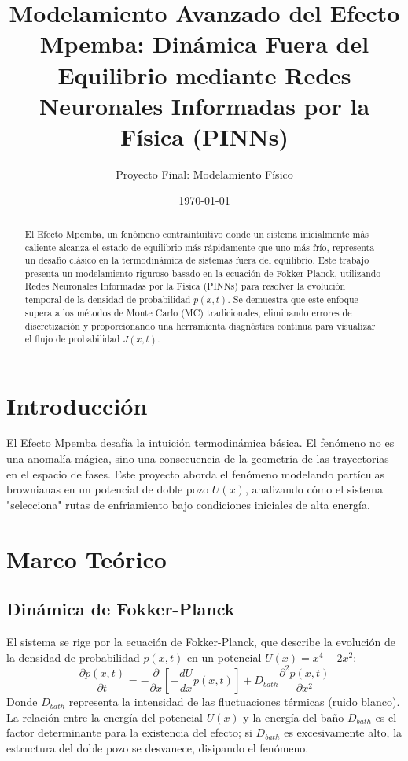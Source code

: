 \documentclass[a4paper,12pt]{article}
\title{Modelamiento Avanzado del Efecto Mpemba: Dinámica Fuera del Equilibrio mediante Redes Neuronales Informadas por la Física (PINNs)}
\author{Proyecto Final: Modelamiento Físico}
\date{\today}
\begin{document}
\maketitle

\begin{abstract}
El Efecto Mpemba, un fenómeno contraintuitivo donde un sistema inicialmente más caliente alcanza el estado de equilibrio más rápidamente que uno más frío, representa un desafío clásico en la termodinámica de sistemas fuera del equilibrio. Este trabajo presenta un modelamiento riguroso basado en la ecuación de Fokker-Planck, utilizando Redes Neuronales Informadas por la Física (PINNs) para resolver la evolución temporal de la densidad de probabilidad $p(x,t)$. Se demuestra que este enfoque supera a los métodos de Monte Carlo (MC) tradicionales, eliminando errores de discretización y proporcionando una herramienta diagnóstica continua para visualizar el flujo de probabilidad $J(x,t)$.
\end{abstract}

\section{Introducción}
El Efecto Mpemba desafía la intuición termodinámica básica. El fenómeno no es una anomalía mágica, sino una consecuencia de la geometría de las trayectorias en el espacio de fases. Este proyecto aborda el fenómeno modelando partículas brownianas en un potencial de doble pozo $U(x)$, analizando cómo el sistema "selecciona" rutas de enfriamiento bajo condiciones iniciales de alta energía.

\section{Marco Teórico}
\subsection{Dinámica de Fokker-Planck}
El sistema se rige por la ecuación de Fokker-Planck, que describe la evolución de la densidad de probabilidad $p(x,t)$ en un potencial $U(x) = x^4 - 2x^2$:
\begin{equation}
\frac{\partial p(x,t)}{\partial t} = -\frac{\partial}{\partial x} \left[ -\frac{dU}{dx} p(x,t) \right] + D_{bath} \frac{\partial^2 p(x,t)}{\partial x^2}
\end{equation}
Donde $D_{bath}$ representa la intensidad de las fluctuaciones térmicas (ruido blanco). La relación entre la energía del potencial $U(x)$ y la energía del baño $D_{bath}$ es el factor determinante para la existencia del efecto; si $D_{bath}$ es excesivamente alto, la estructura del doble pozo se desvanece, disipando el fenómeno.
\end{document}
